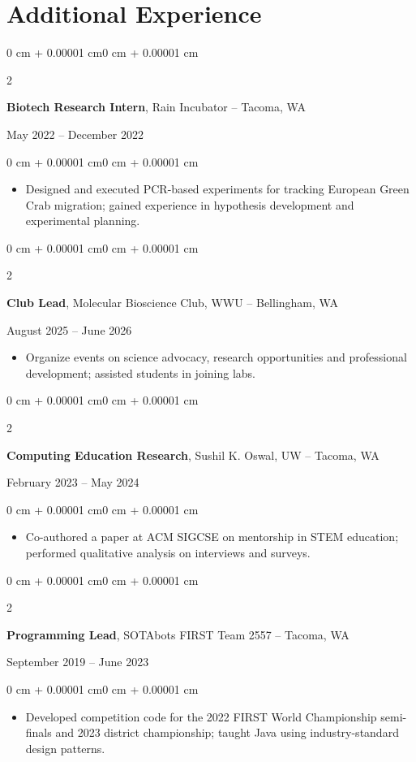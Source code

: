 \documentclass[10pt]{article}
\newenvironment{highlights}{
    \begin{itemize}[
        topsep=0.02 cm,
        parsep=0.02 cm,
        partopsep=0pt,
        itemsep=0pt,
        leftmargin=0 cm + 8pt
    ]
}{
    \end{itemize}
}
\newenvironment{onecolentry}{
    \begin{adjustwidth}{0 cm + 0.00001 cm}{0 cm + 0.00001 cm}
}{
    \end{adjustwidth}
}
\newenvironment{twocolentry}[2][]{
    \onecolentry
    \def\secondColumn{#2}
    \setcolumnwidth{\fill, 4.5 cm}
    \begin{paracol}{2}
}{
    \switchcolumn \raggedleft \secondColumn
    \end{paracol}
    \endonecolentry
}
\begin{document}
\section{Additional Experience}

\begin{twocolentry}{May 2022 -- December 2022}
	\textbf{Biotech Research Intern}, Rain Incubator -- Tacoma, WA
\end{twocolentry}
\begin{onecolentry}
	\begin{highlights}
		\item Designed and executed PCR-based experiments for tracking European Green Crab migration; gained experience in hypothesis development and experimental planning.
	\end{highlights}
\end{onecolentry}

\vspace{0.03 cm}

\begin{twocolentry}{August 2025 -- June 2026}
	\textbf{Club Lead}, Molecular Bioscience Club, WWU -- Bellingham, WA
\end{twocolentry}
\begin{highlights}
	\item Organize events on science advocacy, research opportunities and professional development; assisted students in joining labs.
\end{highlights}

\vspace{0.03 cm}

\begin{twocolentry}{February 2023 -- May 2024}
	\textbf{Computing Education Research}, Sushil K. Oswal, UW -- Tacoma, WA
\end{twocolentry}
\begin{onecolentry}
	\begin{highlights}
		\item Co-authored a paper at ACM SIGCSE on mentorship in STEM education; performed qualitative analysis on interviews and surveys.
	\end{highlights}
\end{onecolentry}

\vspace{0.03 cm}

\begin{twocolentry}{September 2019 -- June 2023}
	\textbf{Programming Lead}, SOTAbots FIRST Team 2557 -- Tacoma, WA
\end{twocolentry}
\begin{onecolentry}
	\begin{highlights}
		\item Developed competition code for the 2022 FIRST World Championship semi-finals and 2023 district championship; taught Java using industry-standard design patterns.
	\end{highlights}
\end{onecolentry}
\end{document}
